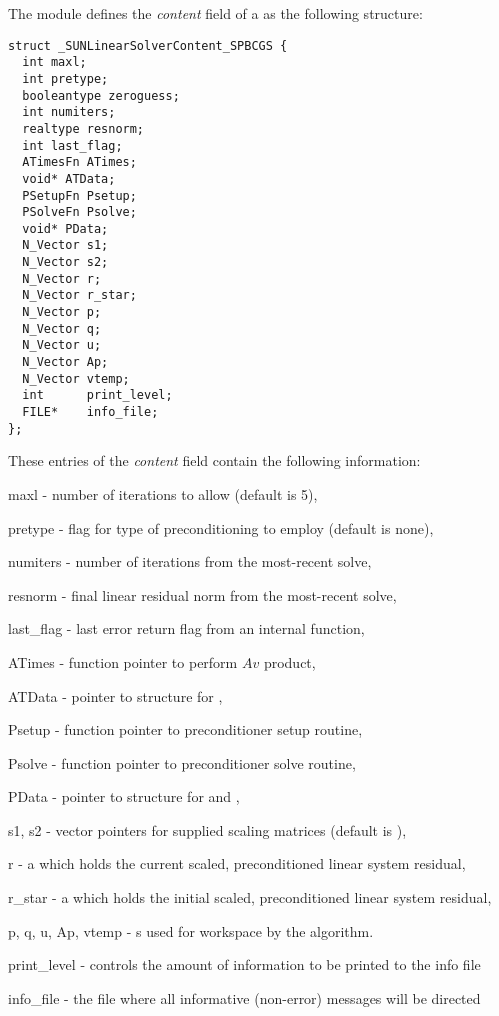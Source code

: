 The {\sunlinsolspbcgs} module defines the \textit{content} field of a
 as the following structure:
\begin{verbatim}
struct _SUNLinearSolverContent_SPBCGS {
  int maxl;
  int pretype;
  booleantype zeroguess;
  int numiters;
  realtype resnorm;
  int last_flag;
  ATimesFn ATimes;
  void* ATData;
  PSetupFn Psetup;
  PSolveFn Psolve;
  void* PData;
  N_Vector s1;
  N_Vector s2;
  N_Vector r;
  N_Vector r_star;
  N_Vector p;
  N_Vector q;
  N_Vector u;
  N_Vector Ap;
  N_Vector vtemp;
  int      print_level;
  FILE*    info_file;
};
\end{verbatim}
These entries of the \emph{content} field contain the following
information:
\begin{args}
  \item[maxl] - number of {\spbcgs} iterations to allow (default is 5),
  \item[pretype] - flag for type of preconditioning to employ
    (default is none),
  \item[numiters] - number of iterations from the most-recent solve,
  \item[resnorm] - final linear residual norm from the most-recent solve,
  \item[last\_flag] - last error return flag from an internal function,
  \item[ATimes] - function pointer to perform $Av$ product,
  \item[ATData] - pointer to structure for ,
  \item[Psetup] - function pointer to preconditioner setup routine,
  \item[Psolve] - function pointer to preconditioner solve routine,
  \item[PData] - pointer to structure for  and ,
  \item[s1, s2] - vector pointers for supplied scaling matrices
    (default is ),
  \item[r] - a {\nvector} which holds the current scaled,
    preconditioned linear system residual,
  \item[r\_star] - a {\nvector} which holds the initial scaled,
    preconditioned linear system residual,
  \item[p, q, u, Ap, vtemp] - {\nvector}s used for workspace by the
    {\spbcgs} algorithm.
  \item[print\_level] - controls the amount of information to be printed to the info file
  \item[info\_file]   - the file where all informative (non-error) messages will be directed
\end{args}
